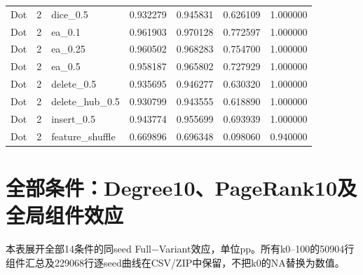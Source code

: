 \documentclass[UTF8,a4paper,11pt,fontset=fandol]{ctexart}
\begin{document}
{\begin{longtable}{lrlrrrr}
Dot & 2 & dice\_0.5 & 0.932279 & 0.945831 & 0.626109 & 1.000000 \\
Dot & 2 & ea\_0.1 & 0.961903 & 0.970128 & 0.772597 & 1.000000 \\
Dot & 2 & ea\_0.25 & 0.960502 & 0.968283 & 0.754700 & 1.000000 \\
Dot & 2 & ea\_0.5 & 0.958187 & 0.965802 & 0.727929 & 1.000000 \\
Dot & 2 & delete\_0.5 & 0.935695 & 0.946277 & 0.630320 & 1.000000 \\
Dot & 2 & delete\_hub\_0.5 & 0.930799 & 0.943555 & 0.618890 & 1.000000 \\
Dot & 2 & insert\_0.5 & 0.943774 & 0.955699 & 0.693939 & 1.000000 \\
Dot & 2 & feature\_shuffle & 0.669896 & 0.696348 & 0.098060 & 0.940000 \\
\end{longtable}
}
\clearpage\section{全部条件：Degree10、PageRank10及全局组件效应}
本表展开全部14条件的同seed Full−Variant效应，单位pp。所有k0--100的50904行组件汇总及229068行逐seed曲线在CSV/ZIP中保留，不把k0的NA替换为数值。
\end{document}
